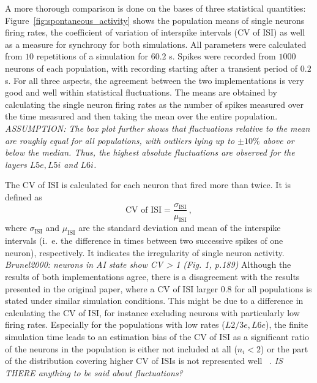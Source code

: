 A more thorough comparison is done on the bases of three statistical quantities: 
Figure~\ref{fig:spontaneous_activity} shows the population means of single neurons firing rates, 
the coefficient of variation of interspike intervals (CV of ISI) as well as a measure for synchrony for both 
simulations. All parameters were calculated from $10$ repetitions of a simulation for 
$60.2$ s. Spikes were recorded from $1000$ neurons of each population, with recording 
starting after a transient period of $0.2$ s. 
For all three aspects, the agreement between the two implementations is very good 
and well within statistical fluctuations. 
The means are obtained by calculating the single neuron firing rates as 
the number of spikes measured over the time measured and then taking the mean over the entire population. 
\emph{ASSUMPTION: The box plot further shows that 
fluctuations relative to the mean are roughly equal for all populations, with outliers lying 
up to $\pm 10 \%$ above or below the median. Thus, the highest absolute fluctuations are observed 
for the layers $L5e, L5i$ and $L6i$.} 

The CV of ISI is calculated for each neuron that fired more than twice.
It is defined as 
\begin{equation}
    \text{CV of ISI} = \frac{\sigma_\text{ISI}}{\mu_\text{ISI}} \,,
    \label{eq:cv_isi}
\end{equation}
where $\sigma_\text{ISI}$ and $\mu_\text{ISI}$ are the standard deviation and mean of 
the interspike intervals (i.~e. the difference in times between two successive spikes of one neuron), 
respectively. 
It indicates the irregularity of single neuron activity.\cite{potjans2014} 
\emph{Brunel2000: neurons in AI state show CV > 1 (Fig. 1, p.189)}
Although the results of both implementations agree, there is a disagreement with the results presented 
in the original paper, where a CV of ISI larger 0.8 for all populations is stated
under similar simulation conditions\cite{potjans2014}. 
This might be due to a difference in calculating the CV of ISI, for instance excluding neurons 
with particularly low firing rates. 
Especially 
for the populations with low rates ($L2/3e, L6e$), the finite simulation time leads to an estimation bias
of the CV of ISI as a significant ratio of the neurons in the population is either not included at all 
($n_i < 2$) or the part of the distribution covering higher CV of ISIs is not represented well~%
\cite{grun2010analysis}. 
\emph{IS THERE anything to be said about fluctuations?}

